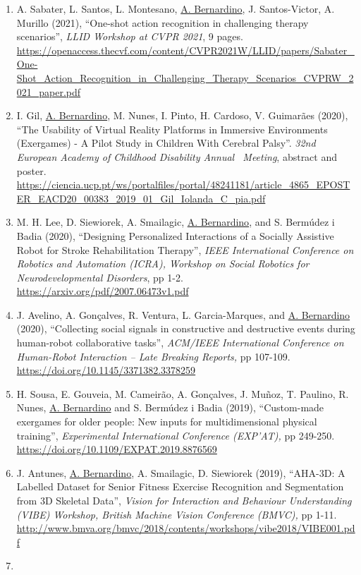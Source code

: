 \documentclass[
]{article}
\begin{document}
\begin{enumerate}
\item
  A. Sabater, L. Santos, L. Montesano, \ul{A. Bernardino}, J.
  Santos-Victor, A. Murillo (2021), ``One-shot action recognition in
  challenging therapy scenarios'', \emph{LLID Workshop at CVPR 2021}, 9
  pages.
  \url{https://openaccess.thecvf.com/content/CVPR2021W/LLID/papers/Sabater_One-Shot_Action_Recognition_in_Challenging_Therapy_Scenarios_CVPRW_2021_paper.pdf}
\item
  I. Gil, \ul{A. Bernardino}, M. Nunes, I. Pinto, H. Cardoso, V.
  Guimarães (2020), ``The Usability of Virtual Reality Platforms in
  Immersive Environments (Exergames) - A Pilot Study in Children With
  Cerebral Palsy''. \emph{32nd European Academy of Childhood Disability
  Annual~ Meeting}, abstract and poster.
  \url{https://ciencia.ucp.pt/ws/portalfiles/portal/48241181/article_4865_EPOSTER_EACD20_00383_2019_01_Gil_Iolanda_C_pia.pdf}
\item
  M. H. Lee, D. Siewiorek, A. Smailagic, \ul{A. Bernardino}, and S.
  Bermúdez i Badia (2020), ``Designing Personalized Interactions of a
  Socially Assistive Robot for Stroke Rehabilitation Therapy'',
  \emph{IEEE International Conference on Robotics and Automation (ICRA),
  Workshop on Social Robotics for Neurodevelopmental Disorders}, pp 1-2.
  \url{https://arxiv.org/pdf/2007.06473v1.pdf}~
\item
  J. Avelino, A. Gonçalves, R. Ventura, L. Garcia-Marques, and \ul{A.
  Bernardino} (2020), ``Collecting social signals in constructive and
  destructive events during human-robot collaborative tasks'',
  \emph{ACM/IEEE International Conference on Human-Robot Interaction --
  Late Breaking Reports,} pp 107-109.
  \url{https://doi.org/10.1145/3371382.3378259}~
\item
  H. Sousa, E. Gouveia, M. Cameirão, A. Gonçalves, J. Muñoz, T. Paulino,
  R. Nunes, \ul{A. Bernardino} and S. Bermúdez i Badia (2019),
  ``Custom-made exergames for older people: New inputs for
  multidimensional physical training'', \emph{Experimental International
  Conference (EXP'AT),} pp 249-250.
  \url{https://doi.org/10.1109/EXPAT.2019.8876569}~~
\item
  J. Antunes, \ul{A. Bernardino}, A. Smailagic, D. Siewiorek (2019),
  ``AHA-3D: A Labelled Dataset for Senior Fitness Exercise Recognition
  and Segmentation from 3D Skeletal Data'', \emph{Vision for Interaction
  and Behaviour Understanding (VIBE) Workshop, British Machine Vision
  Conference (BMVC),} pp 1-11.
  \url{http://www.bmva.org/bmvc/2018/contents/workshops/vibe2018/VIBE001.pdf}
\item

\end{enumerate}
\end{document}
